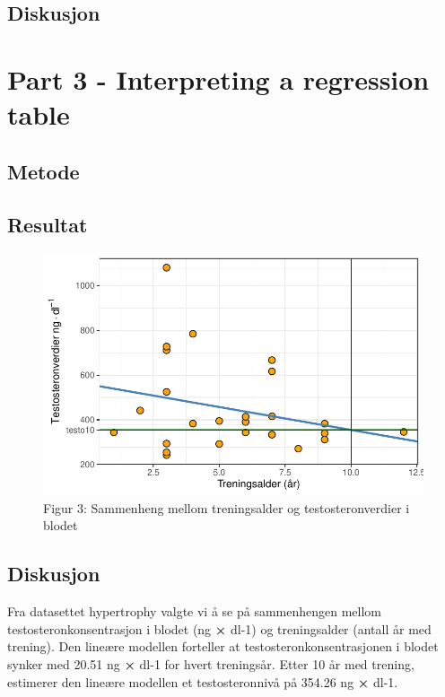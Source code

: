 \documentclass[
  letterpaper,
  DIV=11,
  numbers=noendperiod]{scrreprt}
\begin{document}
\subsection{Diskusjon}\label{diskusjon-2}

\section{Part 3 - Interpreting a regression
table}\label{part-3---interpreting-a-regression-table}

\subsection{Metode}\label{metode-3}

\subsection{Resultat}\label{resultat-3}

\begin{figure}[H]

{\centering \includegraphics{02-regression-models_files/figure-pdf/tolkning av regresjonsmodell-1.pdf}

}

\caption{Figur 3: Sammenheng mellom treningsalder og testosteronverdier
i blodet}

\end{figure}%

\subsection{Diskusjon}\label{diskusjon-3}

Fra datasettet hypertrophy valgte vi å se på sammenhengen mellom
testosteronkonsentrasjon i blodet (ng \textbf{×} dl-1) og treningsalder
(antall år med trening). Den lineære modellen forteller at
testosteronkonsentrasjonen i blodet synker med 20.51 ng \textbf{×} dl-1
for hvert treningsår. Etter 10 år med trening, estimerer den lineære
modellen et testosteronnivå på 354.26 ng \textbf{×} dl-1.
\end{document}
